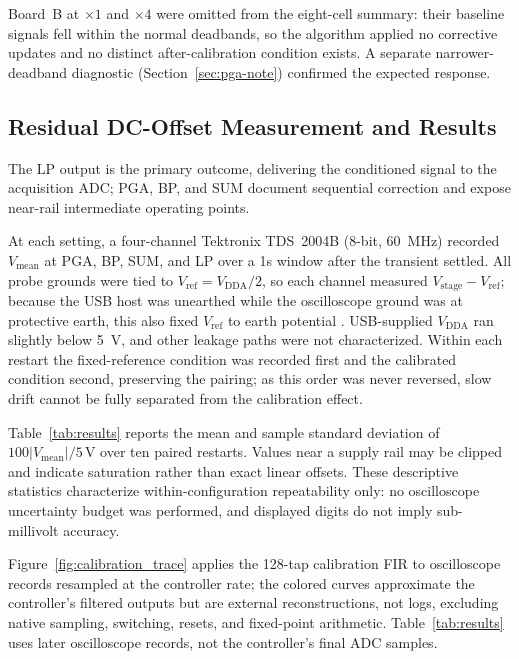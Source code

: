 Board~B at $\times1$ and $\times4$ were omitted from the eight-cell summary: their baseline signals fell within the normal deadbands, so the algorithm applied no corrective updates and no distinct after-calibration condition exists. A separate narrower-deadband diagnostic (Section~\ref{sec:pga-note}) confirmed the expected response.

\subsection{Residual DC-Offset Measurement and Results}

The LP output is the primary outcome, delivering the conditioned signal to the acquisition ADC; PGA, BP, and SUM document sequential correction and expose near-rail intermediate operating points.

At each setting, a four-channel Tektronix TDS~2004B (8-bit, 60~MHz) recorded $V_{\mathrm{mean}}$ at PGA, BP, SUM, and LP over a 1s window after the transient settled. All probe grounds were tied to $V_{\mathrm{ref}}=V_{\mathrm{DDA}}/2$, so each channel measured $V_{\mathrm{stage}}-V_{\mathrm{ref}}$; because the USB host was unearthed while the oscilloscope ground was at protective earth, this also fixed $V_{\mathrm{ref}}$ to earth potential \cite{TektronixTDS2000B}. USB-supplied $V_{\mathrm{DDA}}$ ran slightly below 5~V, and other leakage paths were not characterized. Within each restart the fixed-reference condition was recorded first and the calibrated condition second, preserving the pairing; as this order was never reversed, slow drift cannot be fully separated from the calibration effect.

Table~\ref{tab:results} reports the mean and sample standard deviation of $100|V_{\mathrm{mean}}|/5\,\mathrm{V}$ over ten paired restarts. Values near a supply rail may be clipped and indicate saturation rather than exact linear offsets. These descriptive statistics characterize within-configuration repeatability only: no oscilloscope uncertainty budget was performed, and displayed digits do not imply sub-millivolt accuracy.

Figure~\ref{fig:calibration_trace} applies the 128-tap calibration FIR to oscilloscope records resampled at the controller rate; the colored curves approximate the controller's filtered outputs but are external reconstructions, not logs, excluding native sampling, switching, resets, and fixed-point arithmetic. Table~\ref{tab:results} uses later oscilloscope records, not the controller's final ADC samples.

